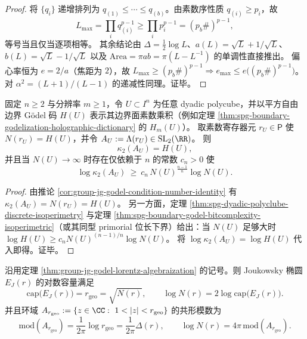 \begin{proof}
将 \(\{q_i\}\) 递增排列为 \(q_{(1)}\le\cdots\le q_{(b)}\)。由素数序性质 \(q_{(i)}\ge p_i\)，故
\[
L_{\max}=\prod_i q_{(i)}^{p-1}\ge \prod_i p_i^{p-1}=(p_b\#)^{p-1},
\]
等号当且仅当逐项相等。
其余结论由 \(\Delta=\tfrac12\log L\)、\(a(L)=\sqrt L+1/\sqrt L\)、\(b(L)=\sqrt L-1/\sqrt L\) 以及 \(\mathrm{Area}=\pi a b=\pi(L-L^{-1})\) 的单调性直接推出。
偏心率恒为 \(e=2/a\)（焦距为 \(2\)），故 \(L_{\max}\ge (p_b\#)^{p-1}\Rightarrow e_{\max}\le e\bigl((p_b\#)^{p-1}\bigr)\)。
对 \(\alpha^2=(L+1)/(L-1)\) 的递减性同理。证毕。
\end{proof}

\begin{corollary}\label{cor:group-jg-dyadic-boundary-godel-ellipse-illconditioning}
固定 \(n\ge 2\) 与分辨率 \(m\ge 1\)，令 \(U\subset I^n\) 为任意 dyadic polycube，并以平方自由边界 Gödel 码 \(H(U)\) 表示其边界面素数乘积（例如定理 \ref{thm:spg-boundary-godelization-holographic-dictionary} 的 \(H_m(U)\)）。
取素数寄存器元 \(r_U\in\mathsf P\) 使 \(N(r_U)=H(U)\)，并令 \(A_U:=\Lambda(r_U)\in \mathrm{SL}_2(\RR)\)。
则
\[
\kappa_2(A_U)=H(U),
\]
并且当 \(N(U)\to\infty\) 时存在仅依赖于 \(n\) 的常数 \(c_n>0\) 使
\[
\log \kappa_2(A_U)\ \ge\ c_n\,N(U)^{\frac{n-1}{n}}\log N(U).
\]
\end{corollary}
\begin{proof}
由推论 \ref{cor:group-jg-godel-condition-number-identity} 有 \(\kappa_2(A_U)=N(r_U)=H(U)\)。
另一方面，定理 \ref{thm:spg-dyadic-polyclube-discrete-isoperimetry} 与定理 \ref{thm:spg-boundary-godel-bitcomplexity-isoperimetric}（或其同型 primorial 位长下界）给出：当 \(N(U)\) 足够大时 \(\log H(U)\ge c_n N(U)^{(n-1)/n}\log N(U)\)。
将 \(\log \kappa_2(A_U)=\log H(U)\) 代入即得。证毕。
\end{proof}

\begin{corollary}\label{cor:group-jg-capacity-modulus-koenigs}
沿用定理 \ref{thm:group-jg-godel-lorentz-algebraization} 的记号。则 Joukowsky 椭圆 \(E_J(r)\) 的对数容量满足
\[
\mathrm{cap}\bigl(E_J(r)\bigr)=r_{\mathrm{geo}}=\sqrt{N(r)},
\qquad
\log N(r)=2\log\mathrm{cap}\bigl(E_J(r)\bigr).
\]
并且环域
\(
A_{r_{\mathrm{geo}}}:=\{z\in\CC:\ 1<|z|<r_{\mathrm{geo}}\}
\)
的共形模数为
\[
\mathrm{mod}(A_{r_{\mathrm{geo}}})=\frac{1}{2\pi}\log r_{\mathrm{geo}}=\frac{1}{2\pi}\Delta(r),
\qquad
\log N(r)=4\pi\,\mathrm{mod}(A_{r_{\mathrm{geo}}}).
\]
\end{corollary}

